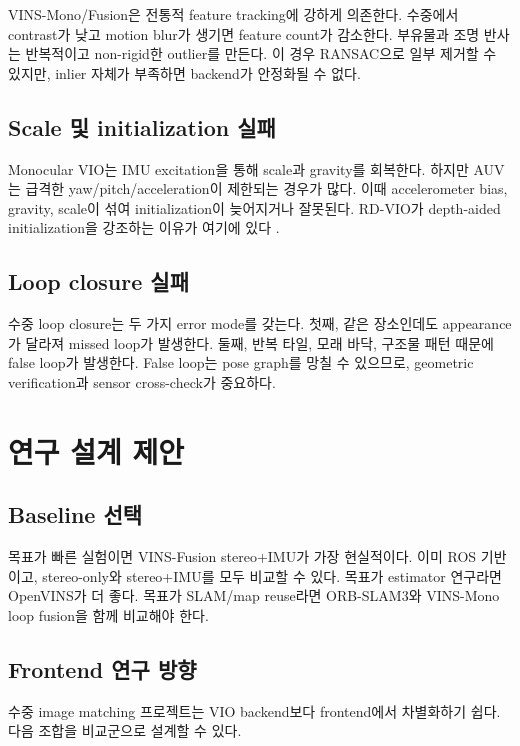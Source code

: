 \documentclass[11pt,a4paper]{article}
\begin{document}
VINS-Mono/Fusion은 전통적 feature tracking에 강하게 의존한다.
수중에서 contrast가 낮고 motion blur가 생기면 feature count가 감소한다.
부유물과 조명 반사는 반복적이고 non-rigid한 outlier를 만든다.
이 경우 RANSAC으로 일부 제거할 수 있지만, inlier 자체가 부족하면 backend가 안정화될 수 없다.

\subsection{Scale 및 initialization 실패}

Monocular VIO는 IMU excitation을 통해 scale과 gravity를 회복한다.
하지만 AUV는 급격한 yaw/pitch/acceleration이 제한되는 경우가 많다.
이때 accelerometer bias, gravity, scale이 섞여 initialization이 늦어지거나 잘못된다.
RD-VIO가 depth-aided initialization을 강조하는 이유가 여기에 있다 \cite{li2023rdvio}.

\subsection{Loop closure 실패}

수중 loop closure는 두 가지 error mode를 갖는다.
첫째, 같은 장소인데도 appearance가 달라져 missed loop가 발생한다.
둘째, 반복 타일, 모래 바닥, 구조물 패턴 때문에 false loop가 발생한다.
False loop는 pose graph를 망칠 수 있으므로, geometric verification과 sensor cross-check가 중요하다.

\section{연구 설계 제안}

\subsection{Baseline 선택}

목표가 빠른 실험이면 VINS-Fusion stereo+IMU가 가장 현실적이다.
이미 ROS 기반이고, stereo-only와 stereo+IMU를 모두 비교할 수 있다.
목표가 estimator 연구라면 OpenVINS가 더 좋다.
목표가 SLAM/map reuse라면 ORB-SLAM3와 VINS-Mono loop fusion을 함께 비교해야 한다.

\subsection{Frontend 연구 방향}

수중 image matching 프로젝트는 VIO backend보다 frontend에서 차별화하기 쉽다.
다음 조합을 비교군으로 설계할 수 있다.
\end{document}
